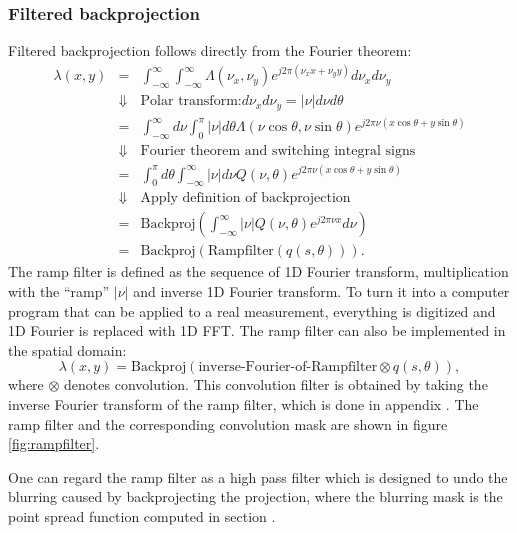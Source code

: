 \subsubsection{Filtered backprojection}
Filtered backprojection follows directly from the Fourier theorem:
\begin{eqnarray}
  \lambda(x,y) & = & \int_{-\infty}^{\infty} \int_{-\infty}^{\infty}
         \Lambda(\nu_x, \nu_y) e^{j2\pi (\nu_x x + \nu_y y)} d \nu_x d \nu_y\\
      & \Downarrow & \mbox{Polar transform:} d \nu_x d \nu_y = |\nu|
         d\nu d\theta \nonumber\\
      & = & \int_{-\infty}^{\infty} d\nu \int_0^\pi |\nu| d\theta
            \Lambda(\nu \cos \theta, \nu \sin \theta)
            e^{j2\pi \nu (x \cos \theta + y \sin \theta)}\\
      & \Downarrow & \mbox{Fourier theorem and switching integral signs}
               \nonumber\\
      & = & \int_0^\pi d\theta \int_{-\infty}^{\infty} |\nu| d\nu
            Q(\nu, \theta) e^{j2\pi \nu (x \cos \theta + y \sin \theta)}\\
      & \Downarrow & \mbox{Apply definition of backprojection} \nonumber\\
      & = & \mbox{Backproj} \left( \int_{-\infty}^{\infty}
            |\nu| Q(\nu, \theta) e^{j2\pi \nu x} d\nu \right)\\
      & = & \mbox{Backproj}\left( \mbox{Rampfilter} \left( q(s,\theta) \right)
            \right).
\end{eqnarray}
The ramp filter is defined as the sequence of 1D Fourier transform,
multiplication with the ``ramp'' $| \nu |$ and inverse 1D Fourier
transform.  To turn it into a computer program that can be applied to
a real measurement, everything is digitized and 1D Fourier is replaced
with 1D FFT. The ramp filter can also be implemented in the spatial
domain:
\begin{equation}
  \lambda(x,y) = \mbox{Backproj}\left( \mbox{inverse-Fourier-of-Rampfilter} 
                  \otimes q(s, \theta) \right),
\end{equation}
where $\otimes$ denotes convolution. This convolution filter is
obtained by taking the inverse Fourier transform of the ramp filter,
which is done in appendix . The ramp filter and the
corresponding convolution mask are shown in figure
\ref{fig:rampfilter}.

One can regard the ramp filter as a high pass filter which is designed to undo
the blurring caused by backprojecting the projection, where the blurring mask
is the point spread function computed in section .


